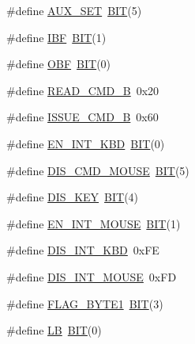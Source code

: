 \begin{DoxyCompactItemize}
\item 
\#define \mbox{\hyperlink{group__i8042_gad319807c29493b0d5c6916b5e50269d8}{A\+U\+X\+\_\+\+S\+ET}}~\mbox{\hyperlink{group__vbe_ga3a8ea58898cb58fc96013383d39f482c}{B\+IT}}(5)
\item 
\#define \mbox{\hyperlink{group__i8042_ga3c48b10907056351582baf9f6478598e}{I\+BF}}~\mbox{\hyperlink{group__vbe_ga3a8ea58898cb58fc96013383d39f482c}{B\+IT}}(1)
\item 
\#define \mbox{\hyperlink{group__i8042_ga45967c9e25447ba853cf6fb4ac545fe6}{O\+BF}}~\mbox{\hyperlink{group__vbe_ga3a8ea58898cb58fc96013383d39f482c}{B\+IT}}(0)
\item 
\#define \mbox{\hyperlink{group__i8042_ga3c8f3d570f82da1110d0f57effa3112f}{R\+E\+A\+D\+\_\+\+C\+M\+D\+\_\+B}}~0x20
\item 
\#define \mbox{\hyperlink{group__i8042_ga7e8f90e986320fbd1d6f22b71d967528}{I\+S\+S\+U\+E\+\_\+\+C\+M\+D\+\_\+B}}~0x60
\item 
\#define \mbox{\hyperlink{group__i8042_ga730367445dff6b45213ac50c475b02ba}{E\+N\+\_\+\+I\+N\+T\+\_\+\+K\+BD}}~\mbox{\hyperlink{group__vbe_ga3a8ea58898cb58fc96013383d39f482c}{B\+IT}}(0)
\item 
\#define \mbox{\hyperlink{group__i8042_ga91a8577f9ccfdba456eb4cb568a35b07}{D\+I\+S\+\_\+\+C\+M\+D\+\_\+\+M\+O\+U\+SE}}~\mbox{\hyperlink{group__vbe_ga3a8ea58898cb58fc96013383d39f482c}{B\+IT}}(5)
\item 
\#define \mbox{\hyperlink{group__i8042_ga038bc8729428bdd48e35ff23538da385}{D\+I\+S\+\_\+\+K\+EY}}~\mbox{\hyperlink{group__vbe_ga3a8ea58898cb58fc96013383d39f482c}{B\+IT}}(4)
\item 
\#define \mbox{\hyperlink{group__i8042_ga48caab510032bf5e44c41f9b1e30b266}{E\+N\+\_\+\+I\+N\+T\+\_\+\+M\+O\+U\+SE}}~\mbox{\hyperlink{group__vbe_ga3a8ea58898cb58fc96013383d39f482c}{B\+IT}}(1)
\item 
\#define \mbox{\hyperlink{group__i8042_ga1ddfd048fd8ccbdc07f69723de35b3b7}{D\+I\+S\+\_\+\+I\+N\+T\+\_\+\+K\+BD}}~0x\+FE
\item 
\#define \mbox{\hyperlink{group__i8042_ga229365f650b36906bd1868ec0b0346c8}{D\+I\+S\+\_\+\+I\+N\+T\+\_\+\+M\+O\+U\+SE}}~0x\+FD
\item 
\#define \mbox{\hyperlink{group__i8042_ga77c4c69c52a0d0a44e35a72d47e083dc}{F\+L\+A\+G\+\_\+\+B\+Y\+T\+E1}}~\mbox{\hyperlink{group__vbe_ga3a8ea58898cb58fc96013383d39f482c}{B\+IT}}(3)
\item 
\#define \mbox{\hyperlink{group__i8042_gacc55daa58d88a3612f2ef74a6abbe97f}{LB}}~\mbox{\hyperlink{group__vbe_ga3a8ea58898cb58fc96013383d39f482c}{B\+IT}}(0)

\end{DoxyCompactItemize}
